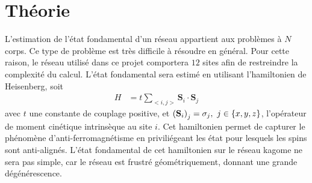 \documentclass[../main.tex]{subfiles}
\begin{document}
  \section{Théorie}
  L'estimation de l'état fondamental d'un réseau appartient aux problèmes à $N$
  corps. Ce type de problème est très difficile à résoudre en général. Pour cette
  raison, le réseau utilisé dans ce projet comportera $12$ sites afin de
  restreindre la complexité du calcul. L'état fondamental sera estimé en utilisant
  l'hamiltonien de Heisenberg, soit
  \begin{align}
      H&=t\sum_{<i,j>}\mathbf{S}_i\cdot\mathbf{S}_j
  \end{align}
  avec $t$ une constante de couplage positive, et $\qty(\mathbf{S}_i)_j=\sigma_j,\ j\in\{x,y,z\}$,
  l'opérateur de moment cinétique intrinsèque au site $i$.
  Cet hamiltonien permet de capturer
  le phénomène d'anti-ferromagnétisme en priviliégeant les état pour lesquels
  les spins sont anti-alignés. L'état fondamental de cet hamiltonien sur le réseau
  kagome ne sera pas simple, car le réseau est frustré géométriquement, donnant
  une grande dégénérescence.
\end{document}
